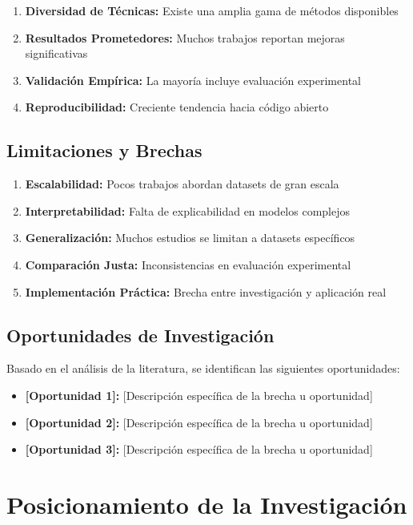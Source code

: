 \begin{enumerate}
    \item \textbf{Diversidad de Técnicas:} Existe una amplia gama de métodos disponibles
    \item \textbf{Resultados Prometedores:} Muchos trabajos reportan mejoras significativas
    \item \textbf{Validación Empírica:} La mayoría incluye evaluación experimental
    \item \textbf{Reproducibilidad:} Creciente tendencia hacia código abierto
\end{enumerate}

\subsection{Limitaciones y Brechas}

\begin{enumerate}
    \item \textbf{Escalabilidad:} Pocos trabajos abordan datasets de gran escala
    \item \textbf{Interpretabilidad:} Falta de explicabilidad en modelos complejos
    \item \textbf{Generalización:} Muchos estudios se limitan a datasets específicos
    \item \textbf{Comparación Justa:} Inconsistencias en evaluación experimental
    \item \textbf{Implementación Práctica:} Brecha entre investigación y aplicación real
\end{enumerate}

\subsection{Oportunidades de Investigación}

Basado en el análisis de la literatura, se identifican las siguientes oportunidades:

\begin{itemize}
    \item \textbf{[Oportunidad 1]:} [Descripción específica de la brecha u oportunidad]
    \item \textbf{[Oportunidad 2]:} [Descripción específica de la brecha u oportunidad]
    \item \textbf{[Oportunidad 3]:} [Descripción específica de la brecha u oportunidad]
\end{itemize}

\section{Posicionamiento de la Investigación}

